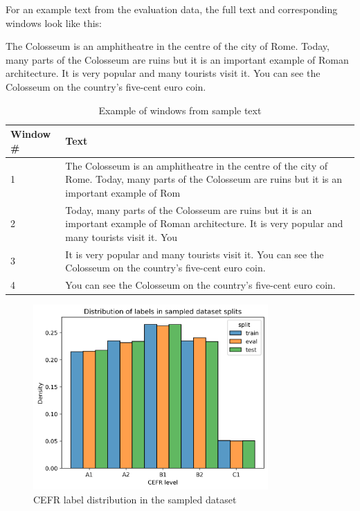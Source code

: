 \documentclass[11pt,a4paper]{article}
\begin{document}
\begin{table}
  \centering
  \begin{adjustwidth}{1cm}{1cm}
  For an example text from the evaluation data, the full text and corresponding
  windows look like this:

  The Colosseum is an amphitheatre in the centre of the city of Rome. Today,
  many parts of the Colosseum are ruins but it is an important example of Roman
  architecture. It is very popular and many tourists visit it. You can see the
  Colosseum on the country’s five-cent euro coin.
  \end{adjustwidth}

  \begin{tabular}{l|p{}}
    \toprule
    Window \# & Text\\
    \midrule
    1 & The Colosseum is an amphitheatre in the centre of the city of Rome.
    Today, many parts of the Colosseum are ruins but it is an important
    example of Rom\\
    \midrule
    2 & Today, many parts of the Colosseum are ruins but it is an important
    example of Roman architecture. It is very popular and many tourists visit
    it. You\\
    \midrule
    3 & It is very popular and many tourists visit it. You can see the
    Colosseum on the country’s five-cent euro coin.\\
    \midrule
    4 & You can see the Colosseum on the country’s five-cent euro coin.\\
    \bottomrule
  \end{tabular}
  \caption{Example of windows from sample text}
  \label{tab:windowing-example}
\end{table}

\begin{figure}
  \centering
  \includegraphics[width=0.8\textwidth]{figures/split-distributions-thinned.png}
  \caption{CEFR label distribution in the sampled dataset}
  \label{fig:cefr-distribution-sampled}
\end{figure}
\end{document}
